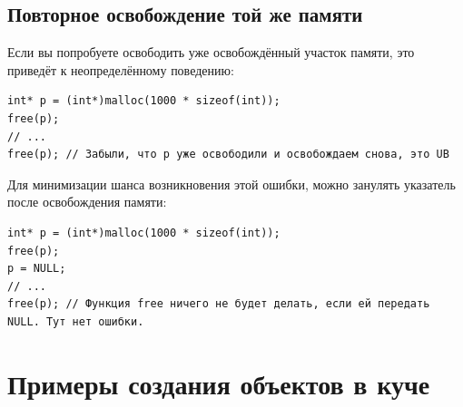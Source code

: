 \documentclass[10pt]{article}
\begin{document}
\subsection*{Повторное освобождение той же памяти}
Если вы попробуете освободить уже освобождённый участок памяти, это приведёт к неопределённому поведению:
\begin{lstlisting}
int* p = (int*)malloc(1000 * sizeof(int));
free(p);
// ...
free(p); // Забыли, что p уже освободили и освобождаем снова, это UB
\end{lstlisting}
Для минимизации шанса возникновения этой ошибки, можно занулять указатель после освобождения памяти:
\begin{lstlisting}
int* p = (int*)malloc(1000 * sizeof(int));
free(p);
p = NULL;
// ...
free(p); // Функция free ничего не будет делать, если ей передать NULL. Тут нет ошибки.
\end{lstlisting}


\section*{Примеры создания объектов в куче}
\end{document}
